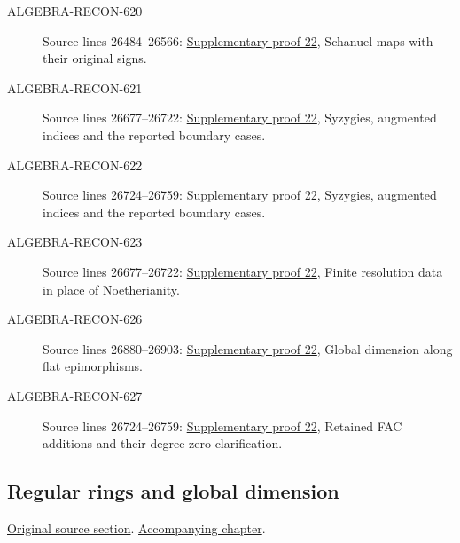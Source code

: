 \begin{description}
\item[ALGEBRA-RECON-620] Source lines 26484--26566: \hyperlink{algebra_pure_global_notes_20260928}{Supplementary proof 22}, Schanuel maps with their original signs.
\item[ALGEBRA-RECON-621] Source lines 26677--26722: \hyperlink{algebra_pure_global_notes_20260928}{Supplementary proof 22}, Syzygies, augmented indices and the reported boundary cases.
\item[ALGEBRA-RECON-622] Source lines 26724--26759: \hyperlink{algebra_pure_global_notes_20260928}{Supplementary proof 22}, Syzygies, augmented indices and the reported boundary cases.
\item[ALGEBRA-RECON-623] Source lines 26677--26722: \hyperlink{algebra_pure_global_notes_20260928}{Supplementary proof 22}, Finite resolution data in place of Noetherianity.
\item[ALGEBRA-RECON-626] Source lines 26880--26903: \hyperlink{algebra_pure_global_notes_20260928}{Supplementary proof 22}, Global dimension along flat epimorphisms.
\item[ALGEBRA-RECON-627] Source lines 26724--26759: \hyperlink{algebra_pure_global_notes_20260928}{Supplementary proof 22}, Retained FAC additions and their degree-zero clarification.
\end{description}

\subsection{Regular rings and global dimension}
\hypertarget{algebra-source-section-regular-finite-gl-dim}{}
\noindent\href{https://github.com/stacks/stacks-project/blob/a04446e57ec1fbc252a871afcec7752fb2807b14/algebra.tex\#L26914}{Original source section}. \href{algebra.pdf\#nameddest=section-regular-finite-gl-dim}{Accompanying chapter}.

